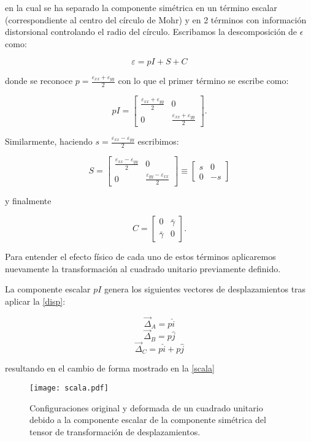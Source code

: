 \documentclass[../notas medios.tex]{subfiles}
\begin{document}
en la cual se ha separado la componente simétrica en un término escalar (correspondiente al centro del círculo de Mohr) y en 2 términos con información distorsional controlando el radio del círculo. Escribamos la descomposición de $\epsilon$ como:

\[\varepsilon  = pI + S + C\]

donde se reconoce $p={\frac{{{\varepsilon _{xx}} + {\varepsilon _{yy}}}}{2}}$ con lo que el primer término se escribe como:


\[pI = \left[ {\begin{array}{*{20}{c}}
{\frac{{{\varepsilon _{xx}} + {\varepsilon _{yy}}}}{2}}&0\\
0&{\frac{{{\varepsilon _{xx}} + {\varepsilon _{yy}}}}{2}}
\end{array}} \right].\]

Similarmente, haciendo $s = \frac{{{\varepsilon _{xx}} - {\varepsilon _{yy}}}}{2}$ escribimos:


\[S = \left[ {\begin{array}{*{20}{c}}
{\frac{{{\varepsilon _{xx}} - {\varepsilon _{yy}}}}{2}}&0\\
0&{\frac{{{\varepsilon _{yy}} - {\varepsilon _{xx}}}}{2}}
\end{array}} \right] \equiv \left[ {\begin{array}{*{20}{c}}
s&0\\
0&{ - s}
\end{array}} \right]\]

y finalmente

\[C = \left[ {\begin{array}{*{20}{c}}
0&\bar{\gamma} \\
\bar{\gamma} &0
\end{array}} \right].\]

Para entender el efecto físico de cada uno de estos términos aplicaremos nuevamente la transformación al cuadrado unitario previamente definido.

La componente escalar $pI$ genera los siguientes vectores de desplazamientos tras aplicar la \cref{disp}:

\[{{\vec \Delta }_A} = p\hat i\]
\[{{\vec \Delta }_B} = p\hat j\]
\[{{\vec \Delta }_C} = p\hat i + p\hat j\]

resultando en el cambio de forma mostrado en la \cref{scala}

\begin{figure}[H]
\centering
	\texttt{[image: scala.pdf]}
	\caption{Configuraciones original y deformada de un cuadrado unitario debido a la componente escalar de la componente simétrica del tensor de transformación de desplazamientos.}
	\label{escalar}
\end{figure}
\end{document}

